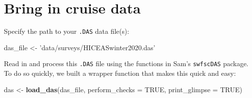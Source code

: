 \documentclass[
]{book}
\newenvironment{Shaded}{\begin{snugshade}}{\end{snugshade}}
\newcommand{\DataTypeTok}[1]{\textcolor[rgb]{0.13,0.29,0.53}{#1}}
\newcommand{\KeywordTok}[1]{\textcolor[rgb]{0.13,0.29,0.53}{\textbf{#1}}}
\newcommand{\NormalTok}[1]{#1}
\newcommand{\OtherTok}[1]{\textcolor[rgb]{0.56,0.35,0.01}{#1}}
\newcommand{\StringTok}[1]{\textcolor[rgb]{0.31,0.60,0.02}{#1}}
\begin{document}
\hypertarget{bring-in-cruise-data}{%
\section*{Bring in cruise data}\label{bring-in-cruise-data}}

Specify the path to your \texttt{.DAS} data file(s):

\begin{Shaded}
\begin{Highlighting}[]
\NormalTok{das_file <-}\StringTok{ 'data/surveys/HICEASwinter2020.das'}
\end{Highlighting}
\end{Shaded}

Read in and process this \texttt{.DAS} file using the functions in Sam's \texttt{swfscDAS} package. To do so quickly, we built a wrapper function that makes this quick and easy:

\begin{Shaded}
\begin{Highlighting}[]
\NormalTok{das <-}\StringTok{ }\KeywordTok{load_das}\NormalTok{(das_file, }
                \DataTypeTok{perform_checks =} \OtherTok{TRUE}\NormalTok{,}
                \DataTypeTok{print_glimpse =} \OtherTok{TRUE}\NormalTok{)}
\end{Highlighting}
\end{Shaded}
\end{document}
